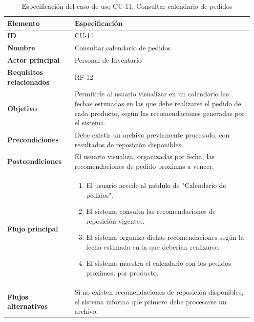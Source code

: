 \begin{table}[H]
\centering
\caption{Especificación del caso de uso CU-11: Consultar calendario de pedidos}
\label{tab:cu11_calendario_pedidos}
\renewcommand{\arraystretch}{1.3}
\begin{tabularx}{\textwidth}{|>{\bfseries}p{3.5cm}|X|}
\hline
Elemento & Especificación \\
\hline
ID & CU-11 \\
\hline
Nombre & Consultar calendario de pedidos \\
\hline
Actor principal & Personal de Inventario \\
\hline
Requisitos relacionados & RF-12 \\
\hline
Objetivo & Permitirle al usuario visualizar en un calendario las fechas estimadas en las que debe realizarse el pedido de cada producto, según las recomendaciones generadas por el sistema. \\
\hline
Precondiciones & Debe existir un archivo previamente procesado, con resultados de reposición disponibles. \\
\hline
Postcondiciones & El usuario visualiza, organizadas por fecha, las recomendaciones de pedido proximas a vencer. \\
\hline
Flujo principal &
\begin{enumerate}
    \item El usuario accede al módulo de "Calendario de pedidos".
    \item El sistema consulta las recomendaciones de reposición vigentes.
    \item El sistema organiza dichas recomendaciones según la fecha estimada en la que deberían realizarse.
    \item El sistema muestra el calendario con los pedidos proximos, por producto.
\end{enumerate} \\
\hline
Flujos alternativos & Si no existen recomendaciones de reposición disponibles, el sistema informa que primero debe procesarse un archivo. \\
\hline
\end{tabularx}
\end{table}


